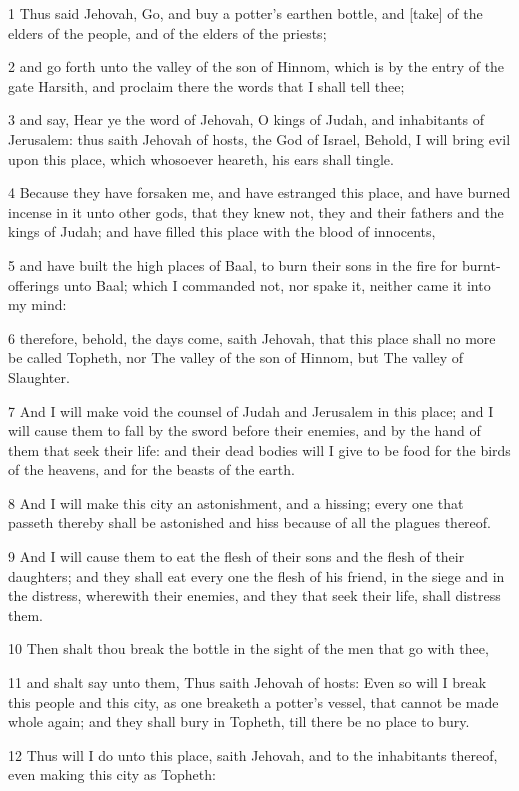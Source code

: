 \par 1 Thus said Jehovah, Go, and buy a potter's earthen bottle, and [take] of the elders of the people, and of the elders of the priests;
\par 2 and go forth unto the valley of the son of Hinnom, which is by the entry of the gate Harsith, and proclaim there the words that I shall tell thee;
\par 3 and say, Hear ye the word of Jehovah, O kings of Judah, and inhabitants of Jerusalem: thus saith Jehovah of hosts, the God of Israel, Behold, I will bring evil upon this place, which whosoever heareth, his ears shall tingle.
\par 4 Because they have forsaken me, and have estranged this place, and have burned incense in it unto other gods, that they knew not, they and their fathers and the kings of Judah; and have filled this place with the blood of innocents,
\par 5 and have built the high places of Baal, to burn their sons in the fire for burnt-offerings unto Baal; which I commanded not, nor spake it, neither came it into my mind:
\par 6 therefore, behold, the days come, saith Jehovah, that this place shall no more be called Topheth, nor The valley of the son of Hinnom, but The valley of Slaughter.
\par 7 And I will make void the counsel of Judah and Jerusalem in this place; and I will cause them to fall by the sword before their enemies, and by the hand of them that seek their life: and their dead bodies will I give to be food for the birds of the heavens, and for the beasts of the earth.
\par 8 And I will make this city an astonishment, and a hissing; every one that passeth thereby shall be astonished and hiss because of all the plagues thereof.
\par 9 And I will cause them to eat the flesh of their sons and the flesh of their daughters; and they shall eat every one the flesh of his friend, in the siege and in the distress, wherewith their enemies, and they that seek their life, shall distress them.
\par 10 Then shalt thou break the bottle in the sight of the men that go with thee,
\par 11 and shalt say unto them, Thus saith Jehovah of hosts: Even so will I break this people and this city, as one breaketh a potter's vessel, that cannot be made whole again; and they shall bury in Topheth, till there be no place to bury.
\par 12 Thus will I do unto this place, saith Jehovah, and to the inhabitants thereof, even making this city as Topheth:
